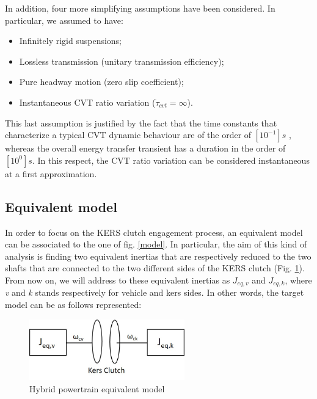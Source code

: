 \documentclass[11pt]{article}
\begin{document}
In addition, four more simplifying assumptions have been considered. In particular, we assumed to have: 

\begin{itemize}
	\item Infinitely rigid suspensions;
	\item Lossless transmission (unitary transmission efficiency);
	\item Pure headway motion (zero slip coefficient);
	\item Instantaneous CVT ratio variation ($\dot{\tau}_{cvt}=\infty$).
\end{itemize}

This last assumption is justified by the fact that the time constants that characterize a typical CVT dynamic behaviour are of the order of $[10^{-1}] s$ \cite{o}, whereas the overall energy transfer transient has a duration in the order of $[10^0] s$. In this respect, the CVT ratio variation can be considered instantaneous at a first approximation.  
 
\newpage
 
\subsection{Equivalent model}

In order to focus on the KERS clutch engagement process, an equivalent model can be associated to the one of fig. \ref{model}. In particular, the aim of this kind of analysis is finding two equivalent inertias that are respectively reduced to the two shafts that are connected to the two different sides of the KERS clutch (Fig. \ref{eq_model}).
From now on, we will address to these equivalent inertias as $J_{eq,v}$ and $J_{eq,k}$, where \textit{v} and \textit{k} stands respectively for vehicle and kers sides.
In other words, the target model can be as follows represented:

\begin{figure}[H]
\centering
\includegraphics[width=0.6\textwidth]{Images/Model/Equivalent_model.jpg}
\caption{Hybrid powertrain equivalent model}
\label{eq_model}
\end{figure}
\end{document}

